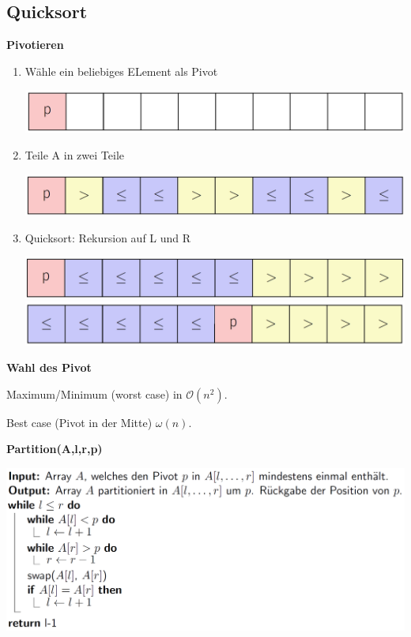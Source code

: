 \begin{sectionbox}
\subsection{Quicksort}\smallskip
\textbf{Pivotieren}\par
\begin{enumerate}
    \item Wähle ein beliebiges ELement als Pivot\par
    \includegraphics[width = 0.4\columnwidth]{../img/pivot1.png}
    \item Teile A in zwei Teile\par
    \includegraphics[width = 0.4\columnwidth]{../img/pivot2.png}
    \item Quicksort: Rekursion auf L und R\par
    \includegraphics[width = 0.4\columnwidth]{../img/pivot3.png}
    \includegraphics[width = 0.4\columnwidth]{../img/pivot4.png}
\end{enumerate}\smallskip
\textbf{Wahl des Pivot}\par
Maximum/Minimum (worst case) in $\mathcal{O}(n^{2})$.\par
Best case (Pivot in der Mitte) $\omega(n)$.\par\smallskip
\textbf{Partition(A,l,r,p)}\par
\includegraphics[width = \columnwidth]{../img/PartCode.png}
\par\smallskip
\end{sectionbox}
